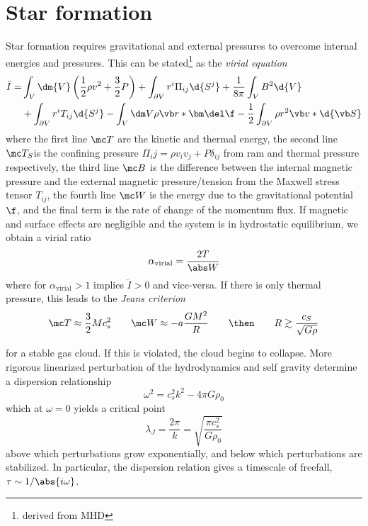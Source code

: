 \documentclass[12pt]{article}
\begin{document}
\section{Star formation}
Star formation requires gravitational and external pressures to overcome internal energies and pressures. This can be stated\cite{krumholz_notes_2016}\footnote{derived from MHD} as the \emph{virial equation}
\begin{align}
    \ddot I =& \int_V\dm{V}\left( \frac{1}{2}\rho v^2 + \frac{3}{2}P \right)+\int_{\partial V}r^i \Pi_{ij}\d{S^j} + \frac{1}{8\pi}\int_V B^2\d{V}\nonumber \\
             &+ \int_{\partial V}r^i T_{ij}\d{S^j}-\int_V\dm V \rho \vb r*\bm \del \f- \frac{1}{2}\int_{\partial V}\rho r^2 \vb v*\d{\vb S}
\end{align}
where the first line \( \mc T \) are the kinetic and thermal energy, the second line \( \mc T_S \)is the confining pressure \( \Pi_ij=\rho v_i v_j + P\delta_{ij} \) from ram and thermal pressure respectively, the third line \( \mc B \) is the difference between the internal magnetic pressure and the external magnetic pressure/tension from the Maxwell stress tensor \( T_{ij} \), the fourth line \( \mc W \) is the energy due to the gravitational potential \( \f \), and the final term is the rate of change of the momentum flux. If magnetic and surface effects are negligible and the system is in hydrostatic equilibrium, we obtain a virial ratio
\begin{equation}
    \alpha_\text{virial} = \frac{2T}{\abs W}
\end{equation}
where for \( \alpha_\text{virial}>1 \) implies \( \ddot I>0 \) and vice-versa. If there is only thermal pressure,
this leads to the \emph{Jeans criterion}
\[ \mc T\approx \frac{3}{2}Mc_s^2 \qquad \mc W\approx -a\frac{GM^2}{R} \qquad\then\qquad R\gtrsim \frac{c_S}{\sqrt{G\rho}}\]
    
for a stable gas cloud. If this is violated, the cloud begins to collapse. More rigorous linearized perturbation of the hydrodynamics and self gravity determine a dispersion relationship
\begin{equation}
\omega^2 = c_s^2k^2 - 4\pi G\rho_0
\end{equation}
which at \( \omega=0 \) yields a critical point
\begin{equation}
    \lambda_J =\frac{2\pi}{k}=\sqrt{\frac{\pi c_s^2}{G\rho_0}}
\end{equation}
above which perturbations grow exponentially, and below which perturbations are stabilized. In particular, the dispersion relation gives a timescale of freefall, \( \tau\sim 1/\abs{i\omega} \). 
\end{document}

